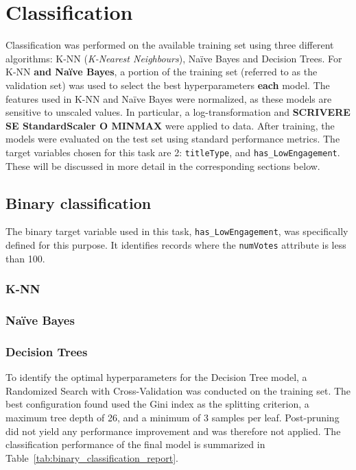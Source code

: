 
\chapter{Classification}
\label{ch:capitolo3}
Classification was performed on the available training set using three different algorithms: K-NN (\textit{K-Nearest Neighbours}), Naïve Bayes and Decision Trees.
For K-NN \textbf{and Naïve Bayes}, a portion of the training set (referred to as the validation set) was used to select the best hyperparameters \textbf{each} model.
The features used in K-NN and Naïve Bayes were normalized, as these models are sensitive to unscaled values.
In particular, a log-transformation and \textbf{SCRIVERE SE StandardScaler O MINMAX} were applied to data.
After training, the models were evaluated on the test set using standard performance metrics. 
The target variables chosen for this task are 2: \texttt{titleType}, and \texttt{has\_LowEngagement}.
These will be discussed in more detail in the corresponding sections below.

\section{Binary classification}\label{sec:binary_classification}
The binary target variable used in this task, \texttt{has\_LowEngagement}, was specifically defined for this purpose. 
It identifies records where the \texttt{numVotes} attribute is less than 100.
\subsection*{K-NN}


\subsection*{Naïve Bayes}


\subsection*{Decision Trees}
To identify the optimal hyperparameters for the Decision Tree model, a Randomized Search with
Cross-Validation was conducted on the training set.
The best configuration found used the Gini index as the splitting criterion,
a maximum tree depth of 26, and a minimum of 3 samples per leaf.
Post-pruning did not yield any performance improvement and was therefore not applied.
The classification performance of the final model is summarized in
Table~\ref{tab:binary_classification_report}.

